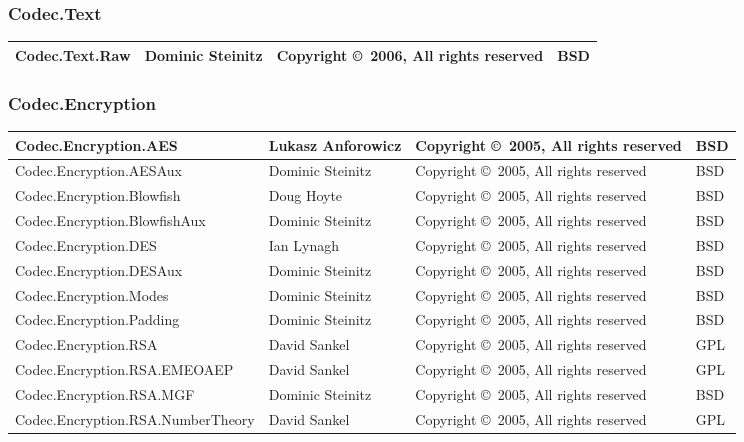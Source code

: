 \documentclass{article}
\begin{document}
\subsubsection{Codec.Text}
\begin{tabular}{|p{6cm}|p{3cm}|p{3cm}|p{1cm}|}
\hline\hline
Codec.Text.Raw & Dominic Steinitz & 
Copyright \copyright\ 2006, All rights reserved & BSD \\
\hline\hline
\end{tabular}

\subsubsection{Codec.Encryption}
\begin{tabular}{|p{6cm}|p{3cm}|p{3cm}|p{1cm}|}
\hline\hline
Codec.Encryption.AES & Lukasz Anforowicz &
Copyright \copyright\ 2005, All rights reserved & BSD \\
\hline
Codec.Encryption.AESAux & Dominic Steinitz &
Copyright \copyright\ 2005, All rights reserved & BSD \\
\hline
Codec.Encryption.Blowfish & Doug Hoyte &
Copyright \copyright\ 2005, All rights reserved & BSD \\
\hline
Codec.Encryption.BlowfishAux & Dominic Steinitz &
Copyright \copyright\ 2005, All rights reserved & BSD \\
\hline
Codec.Encryption.DES & Ian Lynagh &
Copyright \copyright\ 2005, All rights reserved & BSD \\
\hline
Codec.Encryption.DESAux & Dominic Steinitz &
Copyright \copyright\ 2005, All rights reserved & BSD \\
\hline
Codec.Encryption.Modes & Dominic Steinitz &
Copyright \copyright\ 2005, All rights reserved & BSD \\
\hline
Codec.Encryption.Padding & Dominic Steinitz &
Copyright \copyright\ 2005, All rights reserved & BSD \\
\hline
Codec.Encryption.RSA & David Sankel &
Copyright \copyright\ 2005, All rights reserved & GPL \\
\hline
Codec.Encryption.RSA.EMEOAEP & David Sankel &
Copyright \copyright\ 2005, All rights reserved & GPL \\
\hline
Codec.Encryption.RSA.MGF & Dominic Steinitz &
Copyright \copyright\ 2005, All rights reserved & BSD \\
\hline
Codec.Encryption.RSA.NumberTheory & David Sankel &
Copyright \copyright\ 2005, All rights reserved & GPL \\
\hline\hline
\end{tabular}
\end{document}
